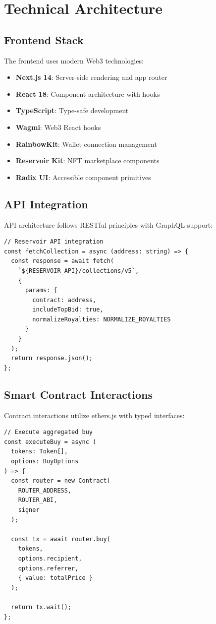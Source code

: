 \section{Technical Architecture}


\subsection{Frontend Stack}

The frontend uses modern Web3 technologies:

\begin{itemize}
\item \textbf{Next.js 14}: Server-side rendering and app router
\item \textbf{React 18}: Component architecture with hooks
\item \textbf{TypeScript}: Type-safe development
\item \textbf{Wagmi}: Web3 React hooks
\item \textbf{RainbowKit}: Wallet connection management
\item \textbf{Reservoir Kit}: NFT marketplace components
\item \textbf{Radix UI}: Accessible component primitives
\end{itemize}

\subsection{API Integration}

API architecture follows RESTful principles with GraphQL support:

\begin{lstlisting}[language=Solidity]
// Reservoir API integration
const fetchCollection = async (address: string) => {
  const response = await fetch(
    `${RESERVOIR_API}/collections/v5`,
    {
      params: {
        contract: address,
        includeTopBid: true,
        normalizeRoyalties: NORMALIZE_ROYALTIES
      }
    }
  );
  return response.json();
};
\end{lstlisting}

\subsection{Smart Contract Interactions}

Contract interactions utilize ethers.js with typed interfaces:

\begin{lstlisting}[language=Solidity]
// Execute aggregated buy
const executeBuy = async (
  tokens: Token[],
  options: BuyOptions
) => {
  const router = new Contract(
    ROUTER_ADDRESS,
    ROUTER_ABI,
    signer
  );
  
  const tx = await router.buy(
    tokens,
    options.recipient,
    options.referrer,
    { value: totalPrice }
  );
  
  return tx.wait();
};
\end{lstlisting}

